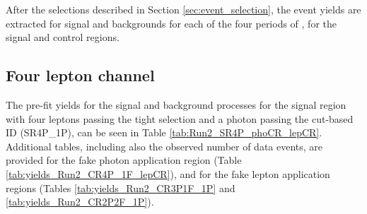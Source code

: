 \label{sec:yields}
After the selections described in Section \ref{sec:event_selection}, the event yields are extracted for signal and backgrounds for each of the four periods of , for the signal and control regions.

\subsection{Four lepton channel}
The pre-fit yields for the signal and background processes for the signal region
with four leptons passing the tight selection and a photon passing the cut-based ID (SR4P\_1P),
can be seen in Table \ref{tab:Run2_SR4P_phoCR_lepCR}.
Additional tables, including also the observed number of data events, are provided
for the fake photon application region (Table \ref{tab:yields_Run2_CR4P_1F_lepCR}),
and for the fake lepton application regions (Tables \ref{tab:yields_Run2_CR3P1F_1P} and \ref{tab:yields_Run2_CR2P2F_1P}).

